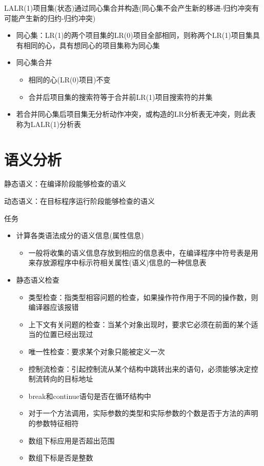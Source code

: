 \documentclass[utf8]{ctexart}
\begin{document}
LALR(1)项目集(状态)通过同心集合并构造(同心集不会产生新的移进-归约冲突有可能产生新的归约-归约冲突)
\begin{itemize}
    \item 同心集：LR(1)的两个项目集的LR(0)项目全部相同，则称两个LR(1)项目集具有相同的心，具有想同心的项目集称为同心集
    \item 同心集合并
    \begin{itemize}
        \item 相同的心(LR(0)项目)不变
        \item 合并后项目集的搜索符等于合并前LR(1)项目搜索符的并集
    \end{itemize}
    \item 若合并同心集后项目集无分析动作冲突，或构造的LR分析表无冲突，则此表称为LALR(1)分析表
\end{itemize}


\section{语义分析}
静态语义：在编译阶段能够检查的语义

动态语义：在目标程序运行阶段能够检查的语义

任务
\begin{itemize}
    \item 计算各类语法成分的语义信息(属性信息)
    \begin{itemize}
        \item 一般将收集的语义信息存放到相应的信息表中，在编译程序中符号表是用来存放源程序中标示符相关属性(语义)信息的一种信息表
    \end{itemize}
    \item 静态语义检查
    \begin{itemize}
        \item 类型检查：指类型相容问题的检查，如果操作符作用于不同的操作数，则编译器应该报错
        \item 上下文有关问题的检查：当某个对象出现时，要求它必须在前面的某个适当的位置已经出现过
        \item 唯一性检查：要求某个对象只能被定义一次
        \item 控制流检查：引起控制流从某个结构中跳转出来的语句，必须能够决定控制流转向的目标地址
        \item break和continue语句是否在循环结构中
        \item 对于一个方法调用，实际参数的类型和实际参数的个数是否于方法的声明的参数特征相符
        \item 数组下标应用是否超出范围
        \item 数组下标是否是整数
    \end{itemize}
\end{itemize}
\end{document}
